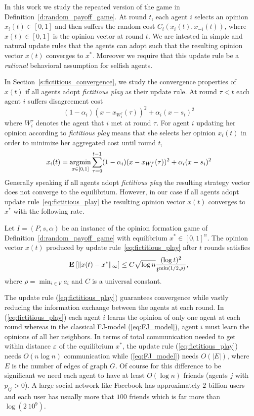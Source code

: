 In this work we study the repeated version of the game in Definition~\ref{d:random_payoff_game}. 
At round $t$, each agent $i$ selects an opinion $x_i(t) \in [0,1]$ and then suffers the
random cost $C_i(x_i(t),x_{-i}(t))$, where $x(t) \in [0,1]$ is the opinion vector at round $t$. 
We are intested in simple and natural update rules
that the agents can adopt such that the resulting opinion vector $x(t)$ converges to $x^*$.
Moreover we require that this update rule be a \emph{rational} behavioral assumption for
selfish agents.

In Section~\ref{s:fictitious_convergence}, we study the convergence properties of $x(t)$ if all agents adopt \emph{fictitious play}
as their update rule. At round $\tau < t$ each agent $i$ suffers disagreement cost
\[(1-\alpha_i)(x-x_{W_i^\tau}(\tau))^2+\alpha_i(x-s_i)^2 \]where $W_i^\tau$
denotes the agent that $i$ met at round $\tau$. For agent $i$ updating her opinion according to \emph{fictitious play}
means that she selects her opinion $x_i(t)$ in order to minimize her aggregated cost until round $t$,
\begin{equation}\label{eq:fictitious_play}
x_i(t) =\operatorname*{argmin}_{x \in [0,1]}\sum_{\tau=0}^{t-1}(1-\alpha_i)(x-x_{W_i^\tau}(\tau))^2+\alpha_i(x-s_i)^2
\end{equation}
\noindent Generally speaking if all agents adopt \emph{fictitious play} the resulting
strategy vector does not converge to the equilibrium. However, in our case if all agents adopt update rule~\ref{eq:fictitious_play}
the resulting opinion vector $x(t)$ converges to $x^*$ with the following
rate.
\begin{theorem}\label{t:fictitious_convergence}
  Let $I = (P,s, \alpha)$ be an instance of the opinion formation
  game of Definition~\ref{d:random_payoff_game} with equilibrium
  $x^* \in [0,1]^n$.  The opinion vector $x(t)$ produced by
  update rule~\ref{eq:fictitious_play} after $t$ rounds satisfies
  \[
    \bm{\mathrm{E}}_{} \left[ \| x(t) - x^* \|_{\infty} \right] \leq
    C \sqrt{\log n}\frac{(\log t)^{2}}{t^{\min(1/2,\rho)}},
  \]
  where $\rho = \min_{i \in V} a_i$ and $C$ is a universal constant.
\end{theorem}
The update rule (\ref{eq:fictitious_play}) guarantees convergence
while vastly reducing the information exchange between the agents
at each round. In (\ref{eq:fictitious_play}) each agent $i$ learns the opinion of only one agent
at each round whereas in the classical FJ-model (\ref{eq:FJ_model}), agent $i$ must
learn the opinions of all her neighbors. In terms of
total communication needed to get within distance $\varepsilon$ of the
equilibrium $x^*$, the update rule (\ref{eq:fictitious_play}) needs
$O(n \log n)$ communication while (\ref{eq:FJ_model}) needs
$O(|E|)$, where $E$ is the number of edges of graph $G$.
Of course for this difference to be significant we need
each agent to have at least $O(\log n)$ friends (agents $j$ with $p_{ij}>0$). A large social
network like Facebook has approximately $2$ billion users and each user
has usually more that $100$ friends which is far more than $\log(2\ 10^9)$.

